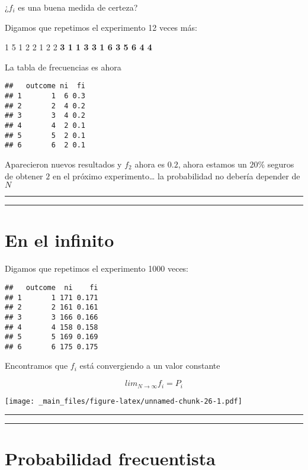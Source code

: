 \documentclass[
]{book}
\begin{document}
¿\(f_i\) es una buena medida de certeza?

Digamos que repetimos el experimento 12 veces más:

1 5 1 2 2 1 2 2 \textbf{3 1 1 3 3 1 6 3 5 6 4 4}

La tabla de frecuencias es ahora

\begin{verbatim}
##   outcome ni  fi
## 1       1  6 0.3
## 2       2  4 0.2
## 3       3  4 0.2
## 4       4  2 0.1
## 5       5  2 0.1
## 6       6  2 0.1
\end{verbatim}

Aparecieron nuevos resultados y \(f_2\) ahora es \(0.2\), ahora estamos un \(20\%\) seguros de obtener \(2\) en el próximo experimento\ldots{} la probabilidad no debería depender de \(N\)

\begin{center}\rule{0.5\linewidth}{0.5pt}\end{center}

\begin{center}\rule{0.5\linewidth}{0.5pt}\end{center}

\hypertarget{en-el-infinito}{%
\section{En el infinito}\label{en-el-infinito}}

Digamos que repetimos el experimento 1000 veces:

\begin{verbatim}
##   outcome  ni    fi
## 1       1 171 0.171
## 2       2 161 0.161
## 3       3 166 0.166
## 4       4 158 0.158
## 5       5 169 0.169
## 6       6 175 0.175
\end{verbatim}

Encontramos que \(f_i\) está convergiendo a un valor constante

\[lim_{N\rightarrow \infty} f_i = P_i\]

\texttt{[image: \_main\_files/figure-latex/unnamed-chunk-26-1.pdf]}

\begin{center}\rule{0.5\linewidth}{0.5pt}\end{center}

\begin{center}\rule{0.5\linewidth}{0.5pt}\end{center}

\hypertarget{probabilidad-frecuentista}{%
\section{Probabilidad frecuentista}\label{probabilidad-frecuentista}}
\end{document}
